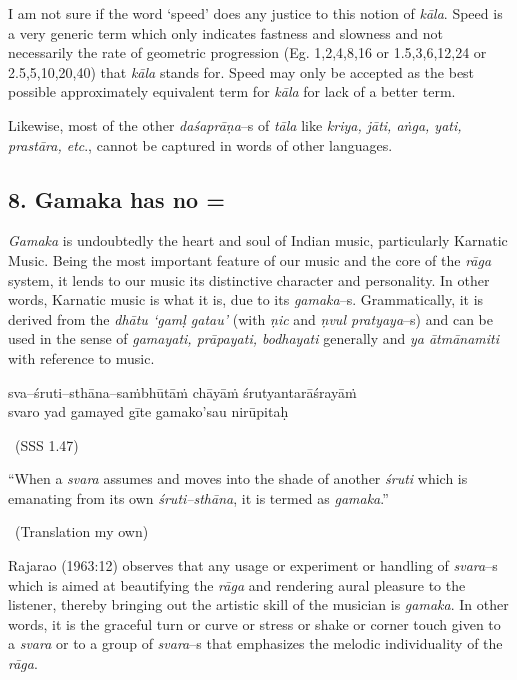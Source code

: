 \newpage

I am not sure if the word ‘speed’ does any justice to this notion of \textit{kāla}. Speed is a very generic term which only indicates fastness and slowness and not necessarily the rate of geometric progression (Eg. 1,2,4,8,16 or 1.5,3,6,12,24 or 2.5,5,10,20,40) that \textit{kāla} stands for. Speed may only be accepted as the best possible approximately equivalent term for \textit{kāla} for lack of a better term.

Likewise, most of the other \textit{daśaprāṇa}–s of \textit{tāla} like \textit{kriya, jāti, aṅga, yati, prastāra, etc}., cannot be captured in words of other languages.


\subsection*{8. Gamaka has no =}

\textit{Gamaka} is undoubtedly the heart and soul of Indian music, particularly Karnatic Music. Being the most important feature of our music and the core of the \textit{rāga} system, it lends to our music its distinctive character and personality. In other words, Karnatic music is what it is, due to its \textit{gamaka}–s. Grammatically, it is derived from the \textit{dhātu ‘gamḷ gatau’} (with \textit{ṇic} and \textit{ṇvul pratyaya}–s) and can be used in the sense of \textit{gamayati, prāpayati, bodhayati} generally and \textit{ya ātmānamiti} with reference to music.

\begin{myquote}
sva–śruti–sthāna–saṁbhūtāṁ chāyāṁ śrutyantarāśrayāṁ \\ svaro yad gamayed gīte gamako’sau nirūpitaḥ  

~\hfill (SSS 1.47)
\end{myquote}

\begin{myquote}
“When a \textit{svara} assumes and moves into the shade of another \textit{śruti} which is emanating from its own \textit{śruti–sthāna}, it is termed as \textit{gamaka}.” 

~\hfill (Translation my own)
\end{myquote}

Rajarao (1963:12) observes that any usage or experiment or handling of \textit{svara}–s which is aimed at beautifying the \textit{rāga} and rendering aural pleasure to the listener, thereby bringing out the artistic skill of the musician is \textit{gamaka}. In other words, it is the graceful turn or curve or stress or shake or corner touch given to a \textit{svara} or to a group of \textit{svara}–s that emphasizes the melodic individuality of the \textit{rāga}.

